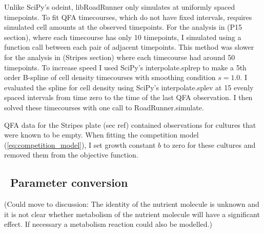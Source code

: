 
Unlike SciPy's odeint, libRoadRunner only simulates at uniformly
spaced timepoints. To fit QFA timecourses, which do not have fixed
intervals, requires simulated cell amounts at the observed
timepoints. For the analysis in (P15 section), where each timecourse
has only 10 timepoints, I simulated using a function call between each
pair of adjacent timepoints. This method was slower for the analysis
in (Stripes section) where each timecourse had around 50
timepoints. To increase speed I used SciPy's interpolate.splrep to
make a 5th order B-spline of cell density timecourses with smoothing
condition \(s=1.0\). I evaluated the spline for cell density using
SciPy's interpolate.splev at 15 evenly spaced intervals from time zero
to the time of the last QFA observation. I then solved these
timecourses with one call to RoadRunner.simulate.

QFA data for the Stripes plate (sec ref) contained observations for
cultures that were known to be empty. When fitting the competition
model (\ref{eq:competition_model}), I set growth constant \(b\) to
zero for these cultures and removed them from the objective function.







\subsection{\thesubsection~Parameter conversion}

(Could move to discussion: The identity of the
nutrient molecule is unknown and it is not clear whether metabolism of
the nutrient molecule will have a significant effect. If necessary a
metabolism reaction could also be modelled.)\\

